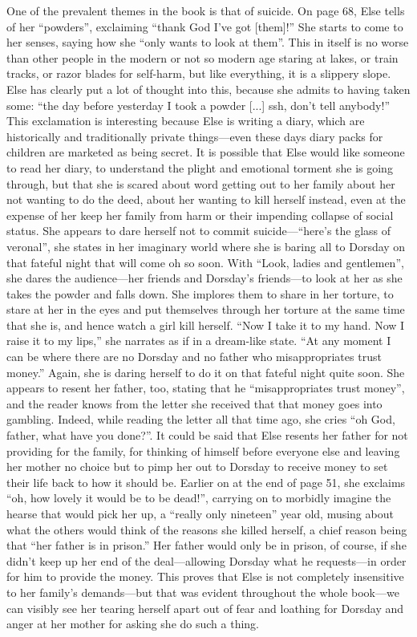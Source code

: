 \documentclass[12pt,a4paper]{article}
\begin{document}
One of the prevalent themes in the book is that of suicide. On page 68, Else tells of her ``powders'', exclaiming ``thank God I've got [them]!'' She starts to come to her senses, saying how she ``only wants to look at them''. This in itself is no worse than other people in the modern or not so modern age staring at lakes, or train tracks, or razor blades for self-harm, but like everything, it is a slippery slope. Else has clearly put a lot of thought into this, because she admits to having taken some: ``the day before yesterday I took a powder [...] ssh, don't tell anybody!'' This exclamation is interesting because Else is writing a diary, which are historically and traditionally private things---even these days diary packs for children are marketed as being secret. It is possible that Else would like someone to read her diary, to understand the plight and emotional torment she is going through, but that she is scared about word getting out to her family about her not wanting to do the deed, about her wanting to kill herself instead, even at the expense of her keep her family from harm or their impending collapse of social status. She appears to dare herself not to commit suicide---``here's the glass of veronal'', she states in her imaginary world where she is baring all to Dorsday on that fateful night that will come oh so soon. With ``Look, ladies and gentlemen'', she dares the audience---her friends and Dorsday's friends---to look at her as she takes the powder and falls down. She implores them to share in her torture, to stare at her in the eyes and put themselves through her torture at the same time that she is, and hence watch a girl kill herself. ``Now I take it to my hand. Now I raise it to my lips,'' she narrates as if in a dream-like state. ``At any moment I can be where there are no Dorsday and no father who misappropriates trust money.'' Again, she is daring herself to do it on that fateful night quite soon. She appears to resent her father, too, stating that he ``misappropriates trust money'', and the reader knows from the letter she received that that money goes into gambling. Indeed, while reading the letter all that time ago, she cries ``oh God, father, what have you done?''. It could be said that Else resents her father for not providing for the family, for thinking of himself before everyone else and leaving her mother no choice but to pimp her out to Dorsday to receive money to set their life back to how it should be. Earlier on at the end of page 51, she exclaims ``oh, how lovely it would be to be dead!'', carrying on to morbidly imagine the hearse that would pick her up, a ``really only nineteen'' year old, musing about what the others would think of the reasons she killed herself, a chief reason being that ``her father is in prison.'' Her father would only be in prison, of course, if she didn't keep up her end of the deal---allowing Dorsday what he requests---in order for him to provide the money. This proves that Else is not completely insensitive to her family's demands---but that was evident throughout the whole book---we can visibly see her tearing herself apart out of fear and loathing for Dorsday and anger at her mother for asking she do such a thing.\\
\end{document}
